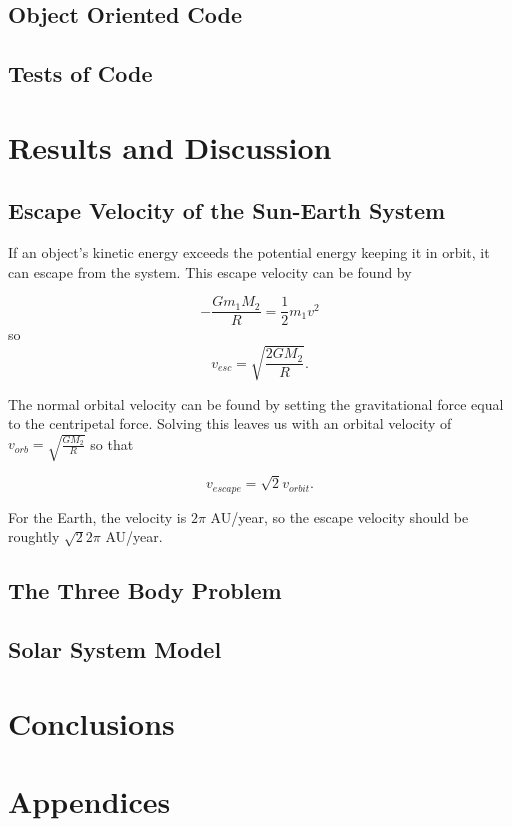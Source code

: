 \documentclass[%
oneside,                 %
final,                   %
10pt]{article}
\begin{document}
\subsection{Object Oriented Code}

\subsection{Tests of Code}

\section{Results and Discussion}


\subsection{Escape Velocity of the Sun-Earth System}

If an object's kinetic energy exceeds the potential energy keeping it in orbit, it can escape from the system.  This escape velocity can be found by

\[
-\frac{G m_1 M_2}{R}=\frac{1}{2}m_1 v^2
\]
so 
\[
v_{esc}=\sqrt{\frac{2GM_2}{R}}.
\]

The normal orbital velocity can be found by setting the gravitational force equal to the centripetal force.  Solving this leaves us with an orbital velocity of $v_{orb}=\sqrt{\frac{GM_2}{R}}$ so that

\[
v_{escape}=\sqrt{2}v_{orbit}.
\]

For the Earth, the velocity is $2 \pi$ AU/year, so the escape velocity should be roughtly $\sqrt{2}2\pi$ AU/year.

\subsection{The Three Body Problem}

\subsection{Solar System Model}


\section{Conclusions}


\section{Appendices}
\end{document}
